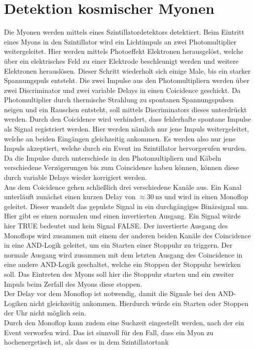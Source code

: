 \section{Detektion kosmischer Myonen}

Die Myonen werden mittels eines Szintillatordetektors detektiert. Beim Eintritt eines Myons in den Szintillator wird ein Lichtimpuls an zwei Photomultiplier weitergeleitet. Hier werden mittels Photoeffekt
Elektronen herausgelöst, welche über ein elektrisches Feld zu einer Elektrode beschleunigt werden und weitere Elektronen herauslösen. Dieser Schritt wiederholt sich einige Male, bis ein starker Spannungspuls entsteht.
Die zwei Impulse aus den Photomultipliern werden über zwei Discriminator und zwei variable Delays in einen Coicidence geschickt. Da Photomultiplier durch thermische Strahlung zu spontanen Spannungspulsen neigen und 
ein Rauschen entsteht, soll mittels Discriminators dieses unterdrückt werden. Durch den Coicidence wird verhindert, dass fehlerhafte spontane Impulse als Signal registriert werden. Hier werden nämlich nur jene Impuls weitergeleitet,
welche an beiden Eingängen gleichzeitig ankommen. Es werden also nur jene Impuls akzeptiert, welche durch ein Event im Szintillator hervorgerufen wurden. Da die Impulse durch unterschiede in den Photomultipliern und Käbeln
verschiedene Verzögerungen bis zum Coincidence haben können, können diese durch variable Delays wieder korrigiert werden.\\
Aus dem Coicidence gehen schließlich drei verschiedene Kanäle aus. Ein Kanal unterläuft zunächst einen kurzen Delay von $\approx \qty{30}{\nano\second}$ und wird in einen Monoflop geleitet. Dieser wandelt das gepulste Signal in ein
durchgängiges Binärsignal um. Hier gibt es einen normalen und einen invertierten Ausgang. Ein Signal würde hier TRUE bedeutet und kein Signal FALSE. Der invertierte Ausgang des Monoflops wird zusammen mit einem der anderen beiden Kanäle des
Coincidence in eine AND-Logik geleitet, um ein Starten einer Stoppuhr zu triggern. Der normale Ausgang wird zusammen mit dem letzten Ausgang des Coincidence in eine andere AND-Logik geschaltet, welche ein Stoppen der Stoppuhr bewirken soll. 
Das Eintreten des Myons soll hier die Stoppuhr starten und ein zweiter Impuls beim Zerfall des Myons diese stoppen.\\
Der Delay vor dem Monoflop ist notwendig, damit die Signale bei den AND-Logiken nicht gleichzeitig ankommen. Hierdurch würde ein Starten oder Stoppen der Uhr nicht möglich sein.\\
Durch den Monoflop kann zudem eine Suchzeit eingestellt werden, nach der ein Event verworfen wird. Das ist sinnvoll für den Fall, dass ein Myon zu hochenergetisch ist, als dass es in dem Szintillatortank
